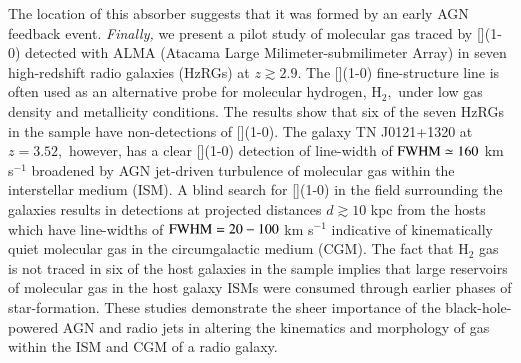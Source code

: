 The location of this absorber suggests that it was formed by an early AGN feedback event. {\it Finally,} we present a pilot study of molecular gas traced by [](1-0) detected with ALMA (Atacama Large Milimeter-submilimeter Array) in seven high-redshift radio galaxies (HzRGs) at $z \gtrsim 2.9.$ The [](1-0) fine-structure line is often used as an alternative probe for molecular hydrogen, H$_2,$ under low gas density and metallicity conditions. The results show that six of the seven HzRGs in the sample have non-detections of [](1-0). The galaxy TN J0121+1320 at $z=3.52,$ however, has a clear [](1-0) detection of line-width of $\rm FWHM\simeq160$ km s$^{-1}$ broadened by AGN jet-driven turbulence of molecular gas within the interstellar medium (ISM). A blind search for [](1-0) in the field surrounding the galaxies results in detections at projected distances $d \gtrsim 10$ kpc from the hosts which have line-widths of $\rm FWHM = 20 - 100$ km s$^{-1}$ indicative of kinematically quiet molecular gas in the circumgalactic medium (CGM). The fact that H$_2$ gas is not traced in six of the host galaxies in the sample implies that large reservoirs of molecular gas in the host galaxy ISMs were consumed through earlier phases of star-formation. These studies demonstrate the sheer importance of the black-hole-powered AGN and radio jets in altering the kinematics and morphology of gas within the ISM and CGM of a radio galaxy. 